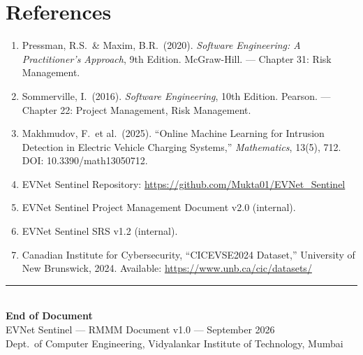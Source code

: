 \documentclass[11pt, a4paper]{article}
\begin{document}
\newpage

\section{References}
\label{sec:references}

\begin{enumerate}[leftmargin=*]
    \item Pressman, R.S.\ \& Maxim, B.R.\ (2020). \textit{Software Engineering: A Practitioner's Approach}, 9th Edition. McGraw-Hill. --- Chapter 31: Risk Management.
    \item Sommerville, I.\ (2016). \textit{Software Engineering}, 10th Edition. Pearson. --- Chapter 22: Project Management, Risk Management.
    \item Makhmudov, F.\ et al.\ (2025). ``Online Machine Learning for Intrusion Detection in Electric Vehicle Charging Systems,'' \textit{Mathematics}, 13(5), 712. DOI: 10.3390/math13050712.
    \item EVNet Sentinel Repository: \url{https://github.com/Mukta01/EVNet_Sentinel}
    \item EVNet Sentinel Project Management Document v2.0 (internal).
    \item EVNet Sentinel SRS v1.2 (internal).
    \item Canadian Institute for Cybersecurity, ``CICEVSE2024 Dataset,'' University of New Brunswick, 2024. Available: \url{https://www.unb.ca/cic/datasets/}
\end{enumerate}

\vfill
\begin{center}
\textcolor{primary}{\rule{0.5\textwidth}{1pt}}\\[0.5em]
{\large\textbf{End of Document}}\\[0.3em]
{\small EVNet Sentinel --- RMMM Document v1.0 --- September 2026}\\[0.2em]
{\small Dept.\ of Computer Engineering, Vidyalankar Institute of Technology, Mumbai}
\end{center}
\end{document}
